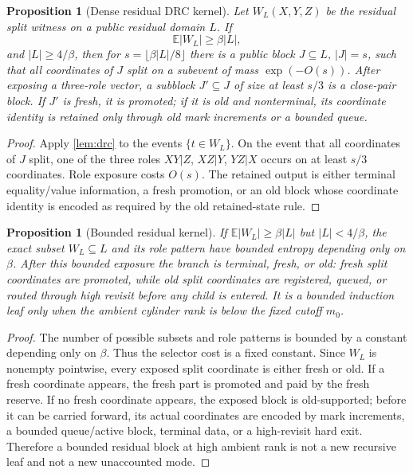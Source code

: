 \documentclass[11pt]{article}
\newcommand{\Cref}[1]{\ref{#1}}
\newtheorem{proposition}[theorem]{Proposition}
\theoremstyle{remark}
\newcommand{\E}{\mathbb E}
\begin{document}
\begin{proposition}[Dense residual DRC kernel]\label{prop:dense-residual}
Let $W_L(X,Y,Z)$ be the residual split witness on a public residual domain $L$.  If
\[
        \E |W_L|\ge \beta |L|,
\]
and $|L|\ge 4/\beta$, then for $s=\lfloor\beta |L|/8\rfloor$ there is a public block $J\subseteq L$, $|J|=s$, such that all coordinates of $J$ split on a subevent of mass $\exp(-O(s))$.  After exposing a three-role vector, a subblock $J'\subseteq J$ of size at least $s/3$ is a close-pair block.  If $J'$ is fresh, it is promoted; if it is old and nonterminal, its coordinate identity is retained only through old mark increments or a bounded queue.
\end{proposition}

\begin{proof}
Apply \Cref{lem:drc} to the events $\{t\in W_L\}$.  On the event that all coordinates of $J$ split, one of the three roles $XY|Z$, $XZ|Y$, $YZ|X$ occurs on at least $s/3$ coordinates.  Role exposure costs $O(s)$.  The retained output is either terminal equality/value information, a fresh promotion, or an old block whose coordinate identity is encoded as required by the old retained-state rule.
\end{proof}

\begin{proposition}[Bounded residual kernel]\label{prop:bounded-residual}
If $\E|W_L|\ge \beta |L|$ but $|L|<4/\beta$, the exact subset
$W_L\subseteq L$ and its role pattern have bounded entropy depending only on
$\beta$.  After this bounded exposure the branch is terminal, fresh, or old:
fresh split coordinates are promoted, while old split coordinates are
registered, queued, or routed through high revisit before any child is entered.
It is a bounded induction leaf only when the ambient cylinder rank is below the
fixed cutoff $m_0$.
\end{proposition}

\begin{proof}
The number of possible subsets and role patterns is bounded by a constant
depending only on $\beta$.  Thus the selector cost is a fixed constant.  Since
$W_L$ is nonempty pointwise, every exposed split coordinate is either fresh or
old.  If a fresh coordinate appears, the fresh part is promoted and paid by the
fresh reserve.  If no fresh coordinate appears, the exposed block is
old-supported; before it can be carried forward, its actual coordinates are
encoded by mark increments, a bounded queue/active block, terminal data, or a
high-revisit hard exit.  Therefore a bounded residual block at high ambient
rank is not a new recursive leaf and not a new unaccounted mode.
\end{proof}
\end{document}
